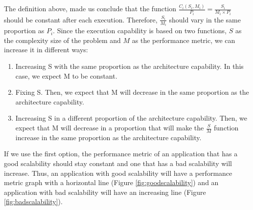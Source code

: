 The definition above, made us conclude that the function $\frac{C_{i}(S_{i},M_{i})}{P_{i}} = \frac{S_{i}}{M_{i} \times P_{i}}$ should be constant after each execution. Therefore, $\frac{S_{i}}{M_{i}}$ should vary in the same proportion as $P_{i}$. Since the execution capability is based on two functions, $S$ as the complexity size of the problem and $M$ as the performance metric, we can increase it in different ways:
\begin{enumerate}
\item Increasing S with the same proportion as the architecture capability. In this case, we expect M to be constant.
\item Fixing S. Then, we expect that M will decrease in the same proportion as the architecture capability.
\item Increasing S in a different proportion of the architecture capability. Then, we expect that M will decrease in a proportion that will make the $\frac{S}{M}$ function increase in the same proportion as the architecture capability.
\end{enumerate}

If we use the first option, the performance metric of an application that has a good scalability should stay constant and one that has a bad scalability will increase. Thus, an application with good scalability will have a performance metric graph with a horizontal line (Figure \ref{fig:goodscalability}) and an application with bad scalability will have an increasing line (Figure \ref{fig:badscalability}).

